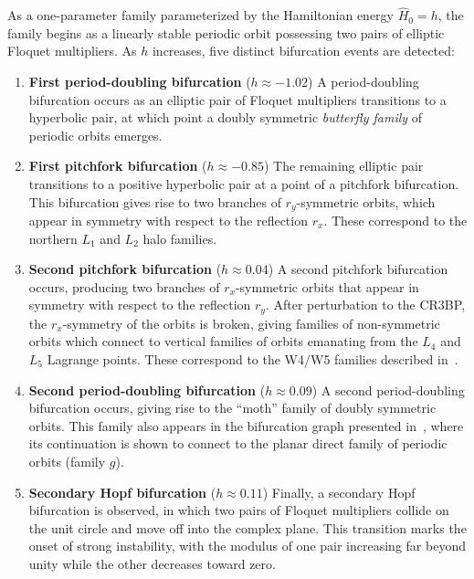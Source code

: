 \documentclass[pdflatex,sn-mathphys-ay]{sn-jnl}%
\theoremstyle{thmstyleone}%
\theoremstyle{thmstyletwo}%
\theoremstyle{thmstylethree}%
\begin{document}
As a one-parameter family parameterized by the Hamiltonian energy $\hat{H}_0=h$, the family begins as a linearly stable periodic orbit possessing two pairs of elliptic Floquet multipliers. 
As $h$ increases, five distinct bifurcation events are detected:
\begin{enumerate}[(1)]
\item \textbf{First period-doubling bifurcation} ($h \approx -1.02$)
A period-doubling bifurcation occurs as an elliptic pair of Floquet multipliers transitions to a hyperbolic pair, at which point a doubly symmetric \emph{butterfly family} of periodic orbits emerges.

\item \textbf{First pitchfork bifurcation} ($h \approx -0.85$)
The remaining elliptic pair transitions to a positive hyperbolic pair at a point of a pitchfork bifurcation.
This bifurcation gives rise to two branches of $r_y$-symmetric orbits, which appear in symmetry with respect to the reflection $r_x$.
These correspond to the northern $L_1$ and $L_2$ halo families.

\item \textbf{Second pitchfork bifurcation} ($h \approx 0.04$)
A second pitchfork bifurcation occurs, producing two branches of $r_x$-symmetric orbits that appear in symmetry with respect to the reflection $r_y$.
After perturbation to the CR3BP, the $r_x$-symmetry of the orbits is broken, giving families of non-symmetric orbits which connect to vertical families of orbits emanating from the $L_4$ and $L_5$ Lagrange points. These correspond to the W4/W5 families described in~\cite{doedel_elemental_2007}.

\item \textbf{Second period-doubling bifurcation} ($h \approx 0.09$)
A second period-doubling bifurcation occurs, giving rise to the ``moth'' family of doubly symmetric orbits.
This family also appears in the bifurcation graph presented in~\cite[Section 5.3]{aydin_Batkhin_hill_2025}, where its continuation is shown to connect to the planar direct family of periodic orbits (family $g$).

\item \textbf{Secondary Hopf bifurcation} ($h \approx 0.11$)
Finally, a secondary Hopf bifurcation is observed, in which two pairs of Floquet multipliers collide on the unit circle and move off into the complex plane.
This transition marks the onset of strong instability, with the modulus of one pair increasing far beyond unity while the other decreases toward zero.
\end{enumerate}
\end{document}
